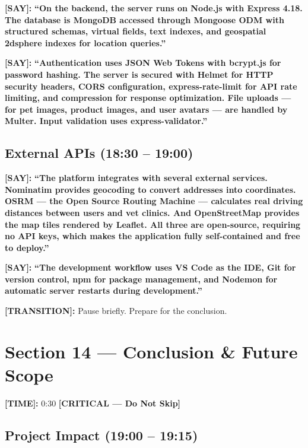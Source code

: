 \documentclass[12pt,a4paper]{article}
\newcommand{\say}[1]{\textbf{\textcolor{narration}{[SAY]:}} \textbf{``#1''}}
\newcommand{\timing}[1]{\textbf{\textcolor{timing}{[TIME]:}} #1}
\newcommand{\trans}[1]{\textbf{\textcolor{transition}{[TRANSITION]:}} #1}
\newcommand{\critical}{\textcolor{critical}{\textbf{[CRITICAL --- Do Not Skip]}}}
\begin{document}
\say{On the backend, the server runs on \textbf{Node.js} with \textbf{Express 4.18}. The database is \textbf{MongoDB} accessed through \textbf{Mongoose} ODM with structured schemas, virtual fields, text indexes, and geospatial 2dsphere indexes for location queries.}

\say{Authentication uses \textbf{JSON Web Tokens} with \textbf{bcrypt.js} for password hashing. The server is secured with \textbf{Helmet} for HTTP security headers, \textbf{CORS} configuration, \textbf{express-rate-limit} for API rate limiting, and \textbf{compression} for response optimization. File uploads --- for pet images, product images, and user avatars --- are handled by \textbf{Multer}. Input validation uses \textbf{express-validator}.}

\subsection{External APIs (18:30 -- 19:00)}

\say{The platform integrates with several external services. \textbf{Nominatim} provides geocoding to convert addresses into coordinates. \textbf{OSRM} --- the Open Source Routing Machine --- calculates real driving distances between users and vet clinics. And \textbf{OpenStreetMap} provides the map tiles rendered by Leaflet. All three are open-source, requiring no API keys, which makes the application fully self-contained and free to deploy.}

\say{The development workflow uses \textbf{VS Code} as the IDE, \textbf{Git} for version control, \textbf{npm} for package management, and \textbf{Nodemon} for automatic server restarts during development.}

\trans{Pause briefly. Prepare for the conclusion.}

\newpage

\section{Section 14 --- Conclusion \& Future Scope}
\label{sec:conclusion}

\timing{0:30} \hfill \critical

\subsection{Project Impact (19:00 -- 19:15)}
\end{document}
